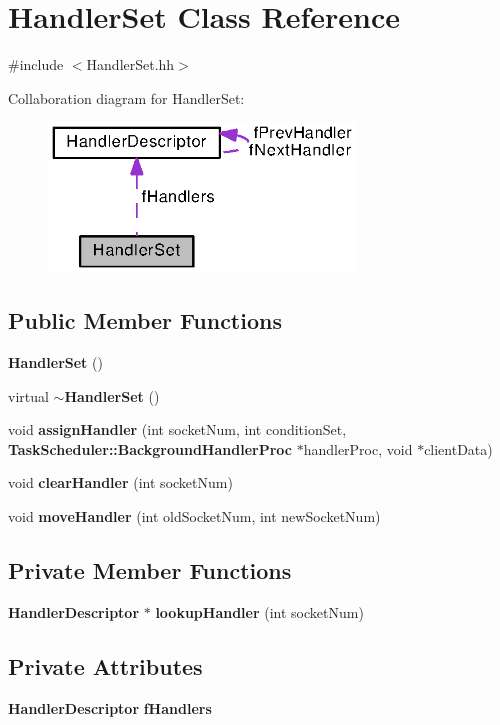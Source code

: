 \section{Handler\+Set Class Reference}
\label{classHandlerSet}


{\ttfamily \#include $<$Handler\+Set.\+hh$>$}



Collaboration diagram for Handler\+Set\+:
\nopagebreak
\begin{figure}[H]
\begin{center}
\leavevmode
\includegraphics[width=231pt]{classHandlerSet__coll__graph}
\end{center}
\end{figure}
\subsection*{Public Member Functions}
\begin{DoxyCompactItemize}
\item 
{\bf Handler\+Set} ()
\item 
virtual {\bf $\sim$\+Handler\+Set} ()
\item 
void {\bf assign\+Handler} (int socket\+Num, int condition\+Set, {\bf Task\+Scheduler\+::\+Background\+Handler\+Proc} $\ast$handler\+Proc, void $\ast$client\+Data)
\item 
void {\bf clear\+Handler} (int socket\+Num)
\item 
void {\bf move\+Handler} (int old\+Socket\+Num, int new\+Socket\+Num)
\end{DoxyCompactItemize}
\subsection*{Private Member Functions}
\begin{DoxyCompactItemize}
\item 
{\bf Handler\+Descriptor} $\ast$ {\bf lookup\+Handler} (int socket\+Num)
\end{DoxyCompactItemize}
\subsection*{Private Attributes}
\begin{DoxyCompactItemize}
\item 
{\bf Handler\+Descriptor} {\bf f\+Handlers}
\end{DoxyCompactItemize}
